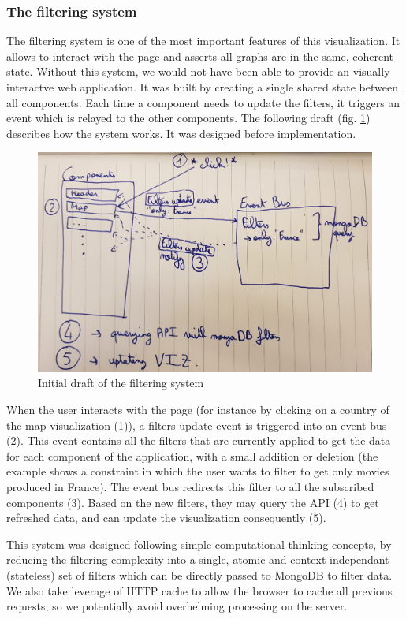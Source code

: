 \documentclass[a4paper,10pt]{article}
\begin{document}
\subsubsection{The filtering system} \label{sec:filtering-system}

The filtering system is one of the most important features of this visualization.
It allows to interact with the page and asserts all graphs are in the same, coherent
state. Without this system, we would not have been able to provide an visually interactve web application.
It was built by creating a single shared state between all components. Each
time a component needs to update the filters, it triggers an event which is relayed
to the other components. The following draft (fig. \ref{fig:draft-filtering}) describes how the system works. It
was designed before implementation.

\begin{figure}[ht]
   \centering
   \includegraphics[width=0.6\linewidth]{images/drafts/filtering-system.jpg}
  \caption{Initial draft of the filtering system} \label{fig:draft-filtering}
\end{figure}

When the user interacts with the page (for instance by clicking on a country of the
map visualization (1)), a filters update event is triggered into an event bus (2). This
event contains all the filters that are currently applied to get the data for each
component of the application, with a small addition or deletion (the example shows
a constraint in which the user wants to filter to get only movies produced in France).
The event bus redirects this filter to all the subscribed components (3). Based on
the new filters, they may query the API (4) to get refreshed data, and can update
the visualization consequently (5).

This system was designed following simple computational thinking concepts, by reducing
the filtering complexity into a single, atomic and context-independant (stateless) set of filters which can be directly
passed to MongoDB to filter data. We also take leverage of HTTP cache to allow
the browser to cache all previous requests, so we potentially avoid overhelming processing
on the server.
\end{document}
